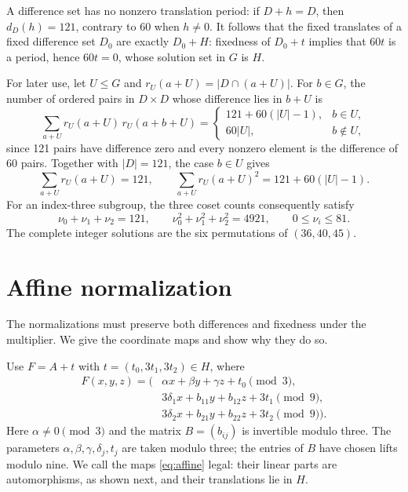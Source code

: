 \documentclass[11pt]{article}
\begin{document}
A difference set has no nonzero translation period: if $D+h=D$,
then $d_D(h)=121$, contrary to $60$ when $h\ne0$.
It follows that the fixed translates of a fixed difference set
$D_0$ are exactly $D_0+H$: fixedness of $D_0+t$ implies that
$60t$ is a period, hence $60t=0$, whose solution set in $G$ is $H$.

For later use, let $U\leq G$ and
$r_U(a+U)=|D\cap(a+U)|$. For $b\in G$, the number of ordered pairs in
$D\times D$ whose difference lies in $b+U$ is
\begin{equation}\label{eq:autocorr}
 \sum_{a+U}r_U(a+U)\,r_U(a+b+U)=
 \begin{cases}121+60(|U|-1),&b\in U,\\60|U|,&b\notin U,\end{cases}
\end{equation}
since 121 pairs have difference zero and every nonzero element is the
difference of 60 pairs. Together with $|D|=121$, the case $b\in U$ gives
\begin{equation}\label{eq:moment}
 \sum_{a+U}r_U(a+U)=121,\qquad
 \sum_{a+U}r_U(a+U)^2=121+60(|U|-1).
\end{equation}
For an index-three subgroup, the three coset counts consequently
satisfy
\begin{equation}\label{eq:triples}
 \nu_0+\nu_1+\nu_2=121,\qquad
 \nu_0^2+\nu_1^2+\nu_2^2=4921,\qquad0\leq \nu_i\leq81.
\end{equation}
The complete integer solutions are the six permutations of
$(36,40,45)$.

\section{Affine normalization}\label{sec:symmetry}

The normalizations must preserve both differences and fixedness under
the multiplier. We give the coordinate maps and show why they do so.

Use $F=A+t$ with $t=(t_0,3t_1,3t_2)\in H$, where
\begin{equation}\label{eq:affine}
\begin{split}
 F(x,y,z)=\bigl(&\alpha x+\beta y+\gamma z+t_0\pmod3,\\
              &3\delta_1x+b_{11}y+b_{12}z+3t_1\pmod9,\\
              &3\delta_2x+b_{21}y+b_{22}z+3t_2\pmod9\bigr).
\end{split}
\end{equation}
Here $\alpha\ne0\pmod3$ and the matrix $B=(b_{ij})$ is invertible
modulo three. The parameters $\alpha,\beta,\gamma,\delta_j,t_j$ are
taken modulo three; the entries of $B$ have chosen lifts modulo nine.
We call the maps \eqref{eq:affine} legal: their linear parts are
automorphisms, as shown next, and their translations lie in $H$.
\end{document}
